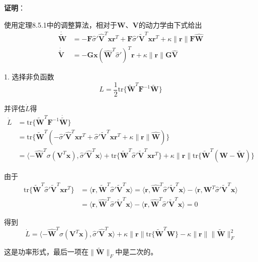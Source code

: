 \documentclass[12pt,a4paper]{ctexart}
\begin{document}
\textbf{证明}：

使用定理8.5.1中的调整算法，相对于$\bm{W}$、$\bm{V}$的动力学由下式给出
\begin{align}
\dot{\tilde{\bm{W}}} &= -\bm{F}\hat{\sigma}'\hat{\bm{V}}^T\bm{x}\bm{r}^T + \bm{F}\hat{\sigma}'\tilde{\bm{V}}^T\bm{x}\bm{r}^T + \kappa\|\bm{r}\|\bm{F}\hat{\bm{W}} \\
\dot{\tilde{\bm{V}}} &= -\bm{G}\bm{x}(\hat{\bm{W}}^T\hat{\sigma}')^T\bm{r} + \kappa\|\bm{r}\|\bm{G}\hat{\bm{V}}
\end{align}

1. 选择非负函数
\begin{equation}
L = \frac{1}{2}\text{tr}\{\tilde{\bm{W}}^T \bm{F}^{-1} \tilde{\bm{W}}\}
\end{equation}

并评估$\dot{L}$得
\begin{align}
\dot{L} &= \text{tr}\{\tilde{\bm{W}}^T \bm{F}^{-1} \dot{\tilde{\bm{W}}}\} \\
&= \text{tr}\{\tilde{\bm{W}}^T(-\hat{\sigma}'\hat{\bm{V}}^T\bm{x}\bm{r}^T + \hat{\sigma}'\tilde{\bm{V}}^T\bm{x}\bm{r}^T + \kappa\|\bm{r}\|\hat{\bm{W}})\} \\
&= \langle -\hat{\bm{W}}^T\sigma(\bm{V}^T\bm{x}), \hat{\sigma}'\hat{\bm{V}}^T\bm{x} \rangle + \text{tr}\{\tilde{\bm{W}}^T\hat{\sigma}'\tilde{\bm{V}}^T\bm{x}\bm{r}^T\} + \kappa\|\bm{r}\|\text{tr}\{\tilde{\bm{W}}^T(\bm{W}-\tilde{\bm{W}})\}
\end{align}

由于
\begin{align}
\text{tr}\{\tilde{\bm{W}}^T\hat{\sigma}'\tilde{\bm{V}}^T\bm{x}\bm{r}^T\} &= \langle \bm{r}, \tilde{\bm{W}}^T\hat{\sigma}'\tilde{\bm{V}}^T\bm{x} \rangle = \langle \bm{r}, \hat{\bm{W}}^T\hat{\sigma}'\tilde{\bm{V}}^T\bm{x} \rangle - \langle \bm{r}, \bm{W}^T\hat{\sigma}'\tilde{\bm{V}}^T\bm{x} \rangle \\
&= \langle \bm{r}, \hat{\bm{W}}^T\hat{\sigma}'\tilde{\bm{V}}^T\bm{x} \rangle - \langle \bm{r}, \hat{\bm{W}}^T\hat{\sigma}'\tilde{\bm{V}}^T\bm{x} \rangle = 0
\end{align}

得到
\begin{equation}
\dot{L} = \langle -\hat{\bm{W}}^T\sigma(\bm{V}^T\bm{x}), \hat{\sigma}'\hat{\bm{V}}^T\bm{x} \rangle + \kappa\|\bm{r}\|\text{tr}\{\tilde{\bm{W}}^T\bm{W}\} - \kappa\|\bm{r}\|\|\tilde{\bm{W}}\|_F^2
\end{equation}

这是功率形式，最后一项在$\|\tilde{\bm{W}}\|_F$中是二次的。
\end{document}
